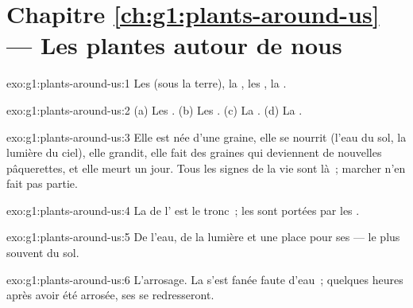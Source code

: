 \section*{Chapitre \ref{ch:g1:plants-around-us} --- Les plantes autour de nous}

\begin{solution}{exo:g1:plants-around-us:1}
Les  (sous la terre), la , les , la .
\end{solution}

\begin{solution}{exo:g1:plants-around-us:2}
(a) Les . (b) Les . (c) La . (d) La .
\end{solution}

\begin{solution}{exo:g1:plants-around-us:3}
Elle est née d'une graine, elle se nourrit (l'eau du sol, la lumière
du ciel), elle grandit, elle fait des graines qui deviennent de
nouvelles pâquerettes, et elle meurt un jour. Tous les signes de la
vie sont là~; marcher n'en fait pas partie.
\end{solution}

\begin{solution}{exo:g1:plants-around-us:4}
La  de l' est le tronc~; les  sont portées par les
.
\end{solution}

\begin{solution}{exo:g1:plants-around-us:5}
De l'eau, de la lumière et une place pour ses  --- le plus
souvent du sol.
\end{solution}

\begin{solution}{exo:g1:plants-around-us:6}
L'arrosage. La  s'est fanée faute d'eau~; quelques heures
après avoir été arrosée, ses  se redresseront.
\end{solution}

